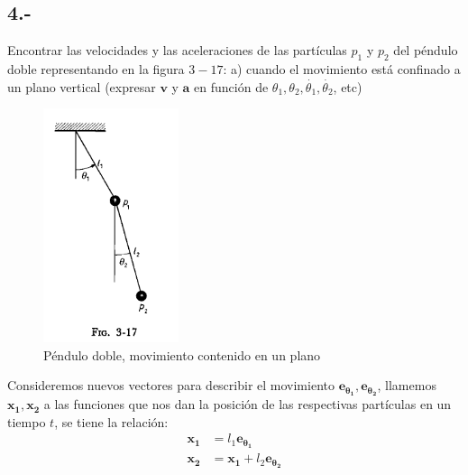 \documentclass{article}
\begin{document}
\subsection*{4.- }
Encontrar las velocidades y las aceleraciones de las partículas $p_1$ y $p_2$
del péndulo doble representando en la figura $3-17$: a) cuando el movimiento está 
confinado a un plano vertical (expresar $\bm{v}$ y $\bm{a}$ en función de 
$\theta_1, \theta_2, \dot{\theta_1}, \dot{\theta_2}$, etc)
\begin{tcolorbox}
    \begin{figure}[H]
        \centering 
        \includegraphics[scale=0.8]{p4-pendulo.png}
        \caption{Péndulo doble, movimiento contenido en un plano}
    \end{figure}
    Consideremos nuevos vectores para describir el movimiento 
    $\bm{e_{\theta_1}, e_{\theta_2}}$, llamemos $\bm{x_1, x_2}$ a las funciones que nos 
    dan la posición de las respectivas partículas en un tiempo $t$, se tiene la relación:
    \begin{align*}
        \bm{x_1} &= l_1\bm{e_{\theta_1}} \\
        \bm{x_2} &= \bm{x_1} + l_2\bm{e_{\theta_2}}  
    \end{align*}
\end{tcolorbox}
\end{document}
